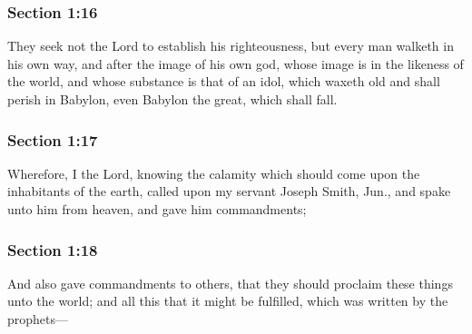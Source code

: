 	\subsubsection{Section 1:16} %
		\label{DC1-16}

		They seek not the Lord to establish his righteousness, but every man walketh in his own way, and after the image of his own god, whose image is in the likeness of the world, and whose substance is that of an idol, which waxeth old and shall perish in Babylon, even Babylon the great, which shall fall.


	\subsubsection{Section 1:17} %
		\label{DC1-17}

		Wherefore, I the Lord, knowing the calamity which should come upon the inhabitants of the earth, called upon my servant Joseph Smith, Jun., and spake unto him from heaven, and gave him commandments;


	\subsubsection{Section 1:18} %
		\label{DC1-18}

		And also gave commandments to others, that they should proclaim these things unto the world; and all this that it might be fulfilled, which was written by the prophets---


